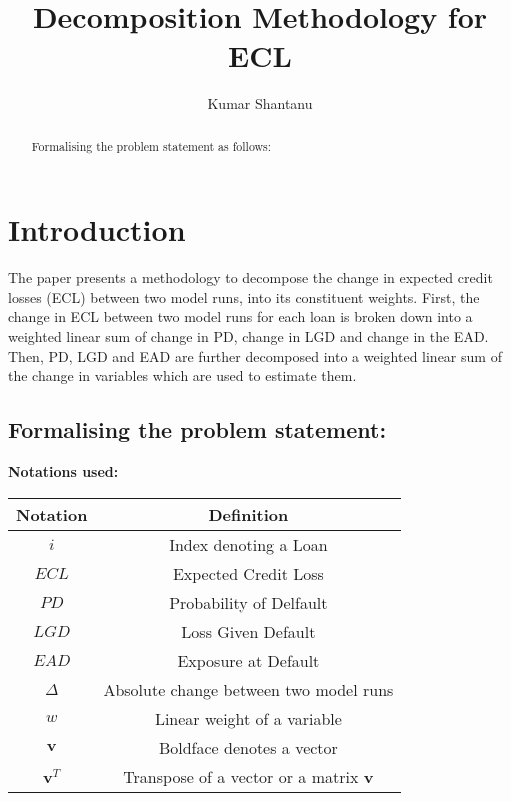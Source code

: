 \documentclass{article}
\title{Decomposition Methodology for ECL}
\author{Kumar Shantanu}
\begin{document}
\maketitle

\begin{abstract}


Formalising the problem statement as follows:


\end{abstract}

\section{Introduction}
The paper presents a methodology to decompose the change in expected credit losses (ECL) between two model runs, into its constituent weights. First, the change in ECL between two model runs for each loan is broken down into a weighted linear sum of change in PD, change in LGD and change in the EAD. Then, PD, LGD and EAD are further decomposed into a weighted linear sum of the change in variables which are used to estimate them.  

\subsection*{Formalising the problem statement: }

\textbf{Notations used: }

\begin{table}[h]
  \centering
  \label{tab:notations}
  \begin{tabular}{cc}
  \hline
  \textbf{Notation} & \textbf{Definition}  \\
  \hline
  $i$ & Index denoting a Loan  \\
  $ECL$ & Expected Credit Loss  \\
  $PD$ & Probability of Delfault  \\
  $LGD$ & Loss Given Default \\
  $EAD$ & Exposure at Default \\
  $\Delta$ & Absolute change between two model runs\\
  $w$ & Linear weight of a variable \\
  $\mathbf{v}$ & Boldface denotes a vector \\
  $\mathbf{v}^T$ & Transpose of a vector or a matrix $\mathbf{v}$ \\

  \hline
  \end{tabular}
  \end{table}
  
\end{document}
